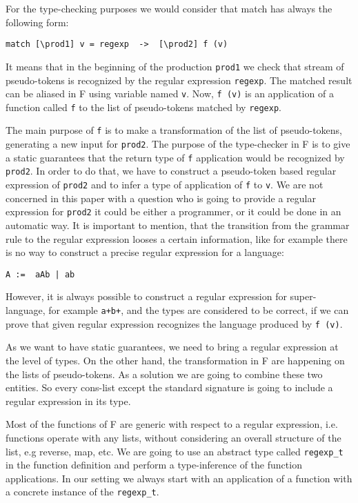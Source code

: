 \documentclass{article}
\begin{document}
For the type-checking purposes we would consider that match has
always the following form:
\begin{verbatim}
match [\prod1] v = regexp  ->  [\prod2] f (v)
\end{verbatim}
It means that in the beginning of the production \verb|prod1|
we check that stream of pseudo-tokens is recognized by the 
regular expression \verb|regexp|. The matched result can be aliased
in F using variable named \verb|v|.  Now, \verb|f (v)| is an application
of a function called \verb|f| to the list of pseudo-tokens matched
by \verb|regexp|.

The main purpose of \verb|f| is to make a transformation of the
list of pseudo-tokens, generating a new input for \verb|prod2|.  The purpose
of the type-checker in F is to give a static guarantees that the
return type of \verb|f| application would be recognized by 
\verb|prod2|.  In order to do that, we have to construct a 
pseudo-token based regular expression of \verb|prod2| and to 
infer a type of application of \verb|f| to \verb|v|.  We are
not concerned in this paper with a question who is going to
provide a regular expression for \verb|prod2| it could be either
a programmer, or it could be done in an automatic way.  It is
important to mention, that the transition from the grammar rule
to the regular expression looses a certain information, like for
example there is no way to construct a precise regular 
expression for a language:
\begin{verbatim}
A :=  aAb | ab
\end{verbatim}
However, it is always possible to construct a regular expression
for super-language, for example \verb|a+b+|, and the types are 
considered to be correct, if we can prove that given regular
expression recognizes the language produced by \verb|f (v)|.

As we want to have static guarantees, we need to bring a
regular expression at the level of types.  On the other hand,
the transformation in F are happening on the lists of pseudo-tokens.
As a solution we are going to combine these two entities.  So
every cons-list except the standard signature is going to include
a regular expression in its type.

Most of the functions of F are generic with respect to a 
regular expression, i.e. functions operate with any lists, without
considering an overall structure of the list, e.g reverse, map, etc.
We are going to use an abstract type called \texttt{regexp\_t} in
the function definition and perform a type-inference of the
function applications.  In our setting we always start with 
an application of a function with a concrete instance of the
\texttt{regexp\_t}.
\end{document}
